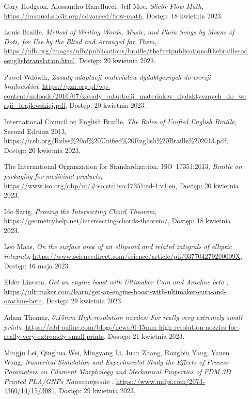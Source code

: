 \documentclass[12pt,a4paper]{article}
\begin{document}
\newpage

\begin{thebibliography}{9}
Gary Hodgson, Alessandro Ranellucci, Jeff Moe,
\textit{Slic3r Flow Math},
\url{https://manual.slic3r.org/advanced/flow-math},
Dostęp: 18 kwietnia 2023.

Louis Braille,
\textit{Method of Writing Words, Music, and Plain Songs by Means of Dots, for Use by the Blind and Arranged for Them},
\url{https://nfb.org/images/nfb/publications/braille/thefirstpublicationofthebraillecodeenglishtranslation.html},
Dostęp: 20 kwietnia 2023.

Paweł Wdówik,
\textit{Zasady adaptacji materiałów dydaktycznych do wersji brajlowskiej},
\url{https://pzn.org.pl/wp-content/uploads/2016/07/zasady_adaptacji_materialow_dydaktycznych_do_wersji_brajlowskiej.pdf},
Dostęp: 20 kwietnia 2023.

International Council on English Braille,
\textit{The Rules of Unified English Braille},
Second Edition 2013,
\url{https://iceb.org/Rules%20of%20Unified%20English%20Braille%202013.pdf},
Dostęp: 20 kwietnia 2023.

The International Organization for Standardization,
ISO 17351:2013,
\textit{Braille on packaging for medicinal products},
\url{https://www.iso.org/obp/ui/#iso:std:iso:17351:ed-1:v1:en},
Dostęp: 20 kwietnia 2023.

Ido Sarig,
\textit{Proving the Intersecting Chord Theorem},
\url{https://geometryhelp.net/intersecting-chords-theorem/},
Dostęp: 18 kwietnia 2023.

Leo Maas,
\textit{On the surface area of an ellipsoid and related integrals of elliptic integrals},
\url{https://www.sciencedirect.com/science/article/pii/037704279200009X},
Dostęp: 16 maja 2023.

Elder Linssen,
\textit{Get an engine boost with Ultimaker Cura and Arachne beta },
\url{https://ultimaker.com/learn/get-an-engine-boost-with-ultimaker-cura-and-arachne-beta},
Dostęp: 29 kwietnia 2023.

Adam Thomas,
\textit{0.15mm High-resolution nozzles: For really very extremely small prints},
\url{https://e3d-online.com/blogs/news/0-15mm-high-resolution-nozzles-for-really-very-extremely-small-prints},
Dostęp: 21 kwietnia 2023.

Mingju Lei, Qinghua Wei, Mingyang Li, Juan Zhang, Rongbin Yang, Yanen Wang,
\textit{Numerical Simulation and Experimental Study the Effects of Process Parameters on Filament Morphology and Mechanical Properties of FDM 3D Printed PLA/GNPs Nanocomposite },
\url{https://www.mdpi.com/2073-4360/14/15/3081},
Dostęp: 29 kwietnia 2023.


\end{thebibliography}
\end{document}
